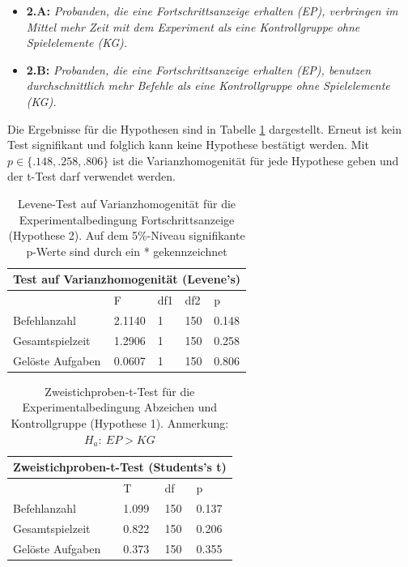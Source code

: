 \begin{itemize}
    \item \textbf{2.A:} \textit{Probanden, die eine Fortschrittsanzeige erhalten (EP), verbringen im Mittel mehr Zeit mit dem Experiment als eine Kontrollgruppe ohne Spielelemente (KG).}
    \item \textbf{2.B:} \textit{Probanden, die eine Fortschrittsanzeige erhalten (EP), benutzen durchschnittlich mehr Befehle als eine Kontrollgruppe ohne Spielelemente (KG).} 
\end{itemize}

Die Ergebnisse für die Hypothesen sind in Tabelle \ref{levene_hypo_2} dargestellt. Erneut ist kein Test signifikant und folglich kann keine Hypothese bestätigt werden. Mit $p\in\{.148, .258, .806\}$ ist die Varianzhomogenität für jede Hypothese geben und der t-Test darf verwendet werden.

\begin{table}[htbp]
\centering
\begin{tabular}{ |p{4cm}||p{2.0cm}|p{2.0cm}|p{2.0cm}|p{2.0cm}| }
 \hline
 \multicolumn{5}{|c|}{Test auf Varianzhomogenität (Levene's)} \\
 \hline
 & F & df1 &df2 &p \\
 \hline
  Befehlanzahl      & 2.1140     & 1 &   150 & 0.148\\
  Gesamtspielzeit   & 1.2906     & 1 &   150 & 0.258\\
  Gelöste Aufgaben  & 0.0607     & 1 &   150 & 0.806\\
 \hline
\end{tabular}
\caption{Levene-Test auf Varianzhomogenität für die Experimentalbedingung Fortschrittsanzeige (Hypothese 2). Auf dem 5\%-Niveau signifikante p-Werte sind durch ein * gekennzeichnet}
\label{levene_hypo_2}
\end{table}
\begin{table}[htbp]
\centering
\begin{tabular}{ |p{4cm}||p{2.0cm}|p{2.0cm}|p{2.0cm}| }
 \hline
 \multicolumn{4}{|c|}{Zweistichproben-t-Test (Students's t)} \\
 \hline
 & T &df & p \\
 \hline
  Befehlanzahl       & 1.099   &   150 & 0.137\\
  Gesamtspielzeit    & 0.822   &   150 & 0.206\\
  Gelöste Aufgaben   & 0.373   &   150 & 0.355\\
 \hline
\end{tabular}
\caption{Zweistichproben-t-Test für die Experimentalbedingung Abzeichen und Kontrollgruppe (Hypothese 1). Anmerkung: $H_a:\: EP > KG$}
\label{ttest_hypo_2}
\end{table}

